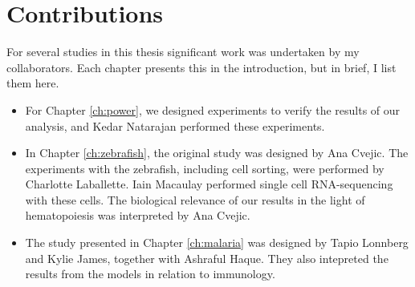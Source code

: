 \section*{Contributions}

For several studies in this thesis significant work was undertaken by my collaborators. Each chapter presents this in the introduction, but in brief, I list them here.

\begin{itemize}
    \item For Chapter \ref{ch:power}, we designed experiments to verify the results of our analysis, and Kedar Natarajan performed these experiments.
    \item In Chapter \ref{ch:zebrafish}, the original study was designed by Ana Cvejic. The experiments with the zebrafish, including cell sorting, were performed by Charlotte Laballette. Iain Macaulay performed single cell RNA-sequencing with these cells. The biological relevance of our results in the light of hematopoiesis was interpreted by Ana Cvejic.
    \item The study presented in Chapter \ref{ch:malaria} was designed by Tapio Lonnberg and Kylie James, together with Ashraful Haque. They also intepreted the results from the models in relation to immunology.
\end{itemize}
